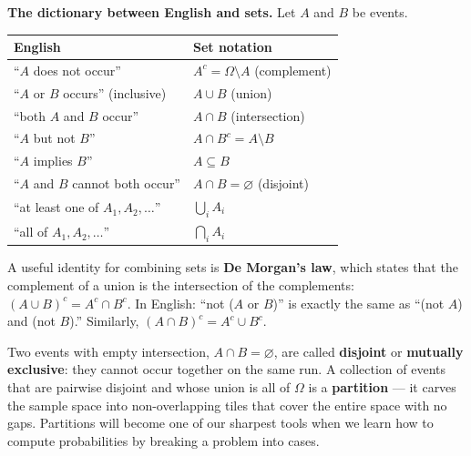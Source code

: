 \begin{focusbox}
\textbf{The dictionary between English and sets.} Let $A$ and $B$ be events.
\begin{center}
\begin{tabular}{@{}ll@{}}
\toprule
\textbf{English} & \textbf{Set notation} \\
\midrule
``$A$ does not occur'' & $A^c = \Omega \setminus A$ (complement) \\
``$A$ or $B$ occurs'' (inclusive) & $A \cup B$ (union) \\
``both $A$ and $B$ occur'' & $A \cap B$ (intersection) \\
``$A$ but not $B$'' & $A \cap B^c = A \setminus B$ \\
``$A$ implies $B$'' & $A \subseteq B$ \\
``$A$ and $B$ cannot both occur'' & $A \cap B = \varnothing$ (disjoint) \\
``at least one of $A_1, A_2, \dots$'' & $\bigcup_i A_i$ \\
``all of $A_1, A_2, \dots$'' & $\bigcap_i A_i$ \\
\bottomrule
\end{tabular}
\end{center}
\end{focusbox}

A useful identity for combining sets is \textbf{De Morgan's law}, which states that the complement of a union is the intersection of the complements: $(A \cup B)^c = A^c \cap B^c$. In English: ``not ($A$ or $B$)'' is exactly the same as ``(not $A$) and (not $B$).'' Similarly, $(A \cap B)^c = A^c \cup B^c$.

Two events with empty intersection, $A \cap B = \varnothing$, are called
\textbf{disjoint} or \textbf{mutually exclusive}: they cannot occur together on
the same run. A collection of events that are pairwise disjoint and whose union
is all of $\Omega$ is a \textbf{partition} --- it carves the sample space into
non-overlapping tiles that cover the entire space with no gaps. Partitions will
become one of our sharpest tools when we learn how to compute probabilities by breaking a problem into cases.

